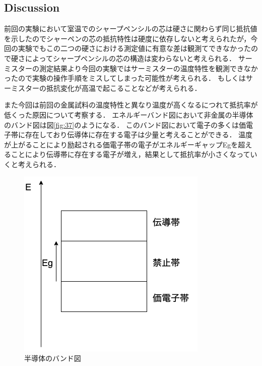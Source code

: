 \documentclass[11pt, a4paper,twocolumn]{jarticle}
\begin{document}
\subsection{Discussion}
前回の実験において室温でのシャープペンシルの芯は硬さに関わらず同じ抵抗値を示したのでシャーペンの芯の抵抗特性は硬度に依存しないと考えられたが，今回の実験でもこの二つの硬さにおける測定値に有意な差は観測てできなかったので硬さによってシャープペンシルの芯の構造は変わらないと考えられる．
サーミスターの測定結果より今回の実験ではサーミスターの温度特性を観測できなかったので実験の操作手順をミスしてしまった可能性が考えられる．
もしくはサーミスターの抵抗変化が高温で起こることなどが考えられる．

また今回は前回の金属試料の温度特性と異なり温度が高くなるにつれて抵抗率が低くった原因について考察する．
エネルギーバンド図において非金属の半導体のバンド図は図\ref{fig:37}のようになる．
このバンド図において電子の多くは価電子帯に存在しており伝導体に存在する電子は少量と考えることができる．
温度が上がることにより励起される価電子帯の電子がエネルギーギャップEgを超えることにより伝導帯に存在する電子が増え，結果として抵抗率が小さくなっていくと考えられる．

\begin{figure}[htbp]
 \begin{center}
  \includegraphics[width=0.8\linewidth]{fig38.png}
 \end{center}
 \caption{半導体のバンド図}
 \label{fig:38}
\end{figure}


\newpage
\end{document}
